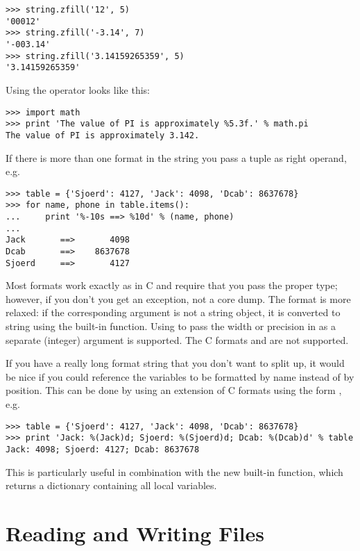 \documentclass{manual}
\begin{document}
\begin{verbatim}
>>> string.zfill('12', 5)
'00012'
>>> string.zfill('-3.14', 7)
'-003.14'
>>> string.zfill('3.14159265359', 5)
'3.14159265359'
\end{verbatim}
%
Using the \code{\%} operator looks like this:

\begin{verbatim}
>>> import math
>>> print 'The value of PI is approximately %5.3f.' % math.pi
The value of PI is approximately 3.142.
\end{verbatim}

If there is more than one format in the string you pass a tuple as
right operand, e.g.

\begin{verbatim}
>>> table = {'Sjoerd': 4127, 'Jack': 4098, 'Dcab': 8637678}
>>> for name, phone in table.items():
...     print '%-10s ==> %10d' % (name, phone)
... 
Jack       ==>       4098
Dcab       ==>    8637678
Sjoerd     ==>       4127
\end{verbatim}

Most formats work exactly as in C and require that you pass the proper
type; however, if you don't you get an exception, not a core dump.
The  format is more relaxed: if the corresponding argument is
not a string object, it is converted to string using the
 built-in function.  Using \code{*} to pass the width
or precision in as a separate (integer) argument is supported.  The
C formats  and  are not supported.

If you have a really long format string that you don't want to split
up, it would be nice if you could reference the variables to be
formatted by name instead of by position.  This can be done by using
an extension of C formats using the form , e.g.

\begin{verbatim}
>>> table = {'Sjoerd': 4127, 'Jack': 4098, 'Dcab': 8637678}
>>> print 'Jack: %(Jack)d; Sjoerd: %(Sjoerd)d; Dcab: %(Dcab)d' % table
Jack: 4098; Sjoerd: 4127; Dcab: 8637678
\end{verbatim}

This is particularly useful in combination with the new built-in
 function, which returns a dictionary containing all
local variables.

\section{Reading and Writing Files \label{files}}
\end{document}
